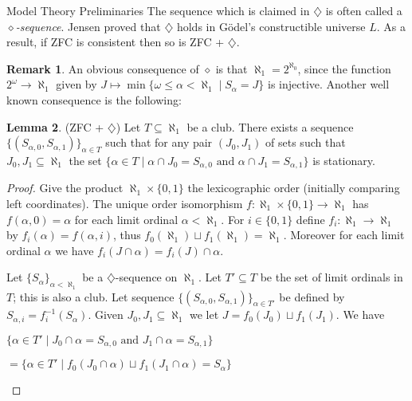 \documentclass{amsart}
\theoremstyle{definition}\newtheorem{theorem}{Theorem}
\theoremstyle{definition}\newtheorem{bigtheorem}{Theorem}
\numberwithin{theorem}{section}
\theoremstyle{definition}\newtheorem{corollary}[theorem]{Corollary}
\theoremstyle{definition}\newtheorem{proposition}[theorem]{Proposition}
\theoremstyle{definition}\newtheorem{definition}[theorem]{Definition}
\theoremstyle{definition}\newtheorem{question}[theorem]{Question}
\theoremstyle{definition}\newtheorem{example}[theorem]{Example}
\theoremstyle{definition}\newtheorem{remark}[theorem]{Remark}
\theoremstyle{definition}\newtheorem{note}[theorem]{Note}
\theoremstyle{definition}\newtheorem{lemma}[theorem]{Lemma}
\theoremstyle{definition}\newtheorem{fact}[theorem]{Fact}
\theoremstyle{definition}\newtheorem{define}[theorem]{Definition}
\theoremstyle{definition}\newtheorem{definitions}[theorem]{Definitions}
\theoremstyle{definition}\newtheorem{claim}[theorem]{Claim}
\theoremstyle{definition}\newtheorem{obs}[theorem]{Observation}
\theoremstyle{definition}\newtheorem{construction}[theorem]{Construction}
\begin{document}
\begin{section}{Model Theory Preliminaries}
The sequence which is claimed in $\diamondsuit$ is often called a \emph{$\diamond$-sequence}.  Jensen proved that $\diamondsuit$ holds in G\"odel's constructible universe $L$.  As a result,  if ZFC is consistent then so is ZFC + $\diamondsuit$.


\begin{remark}\label{CH}  An obvious consequence of $\diamond$ is that $\aleph_1 = 2^{\aleph_0}$, since the function $2^{\omega} \rightarrow \aleph_1$ given by $J \mapsto \min \{\omega \leq \alpha <\aleph_1 \mid S_{\alpha} = J\}$ is injective.  Another well known consequence is the following:
\end{remark}


\begin{lemma}\label{twosetsnotone} (ZFC + $\diamondsuit$)  Let $T\subseteq \aleph_1$ be a club. There exists a sequence $\{(S_{\alpha, 0}, S_{\alpha, 1})\}_{\alpha \in T}$ such that for any pair $(J_0, J_1)$ of sets such that $J_0, J_1 \subseteq \aleph_1$ the set $\{\alpha \in T\mid \alpha\cap J_0 = S_{\alpha, 0} \text{ and } \alpha \cap J_1 = S_{\alpha, 1}\}$ is stationary.
\end{lemma}

\begin{proof}  Give the product $\aleph_1 \times \{0, 1\}$ the lexicographic order (initially comparing left coordinates).  The unique order isomorphism $f: \aleph_1 \times \{0, 1\} \rightarrow \aleph_1$ has $f(\alpha, 0) = \alpha$ for each limit ordinal $\alpha <\aleph_1$. For $i\in \{0, 1\}$ define $f_i: \aleph_1 \rightarrow \aleph_1$ by $f_i(\alpha) = f(\alpha, i)$, thus $f_0(\aleph_1) \sqcup f_1(\aleph_1) = \aleph_1$.  Moreover for each limit ordinal $\alpha$ we have $f_i(J \cap \alpha) = f_i(J) \cap \alpha$.

Let $\{S_{\alpha}\}_{\alpha < \aleph_1}$ be a $\diamondsuit$-sequence on $\aleph_1$.  Let $T'\subseteq T$ be the set of limit ordinals in $T$; this is also a club.  Let sequence $\{(S_{\alpha, 0}, S_{\alpha, 1})\}_{\alpha \in T'}$ be defined by $S_{\alpha, i} = f_i^{-1}(S_{\alpha})$.  Given $J_0, J_1 \subseteq \aleph_1$ we let $J = f_0(J_0) \sqcup f_1(J_1)$.  We have

\begin{center}

$\{\alpha \in T' \mid J_0\cap \alpha = S_{\alpha, 0} \text{ and }J_1 \cap \alpha = S_{\alpha, 1}\}$

$= \{\alpha \in T' \mid f_0(J_0 \cap \alpha) \sqcup f_1(J_1 \cap \alpha) = S_{\alpha}\}$


\end{center}
\end{proof}
\end{section}
\end{document}
